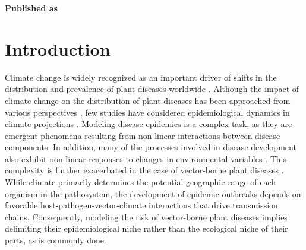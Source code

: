 \vspace{3cm}





\textbf{Published as}

\vspace{0.5cm}


\newpage
\section{Introduction}

Climate change is widely recognized as an important driver of shifts in the
distribution and prevalence of plant diseases worldwide
\cite{harvell2002climate, Delgado-Baquerizo2020,  Rocklov2020, Dudney2021,
    Chaloner2021, Singh2023}. Although the impact of climate change on the
distribution of plant diseases has been approached from various perspectives
\cite{bergot2004simulation,pangga2011pathogen}, few studies have considered
epidemiological dynamics in climate projections
\cite{bebber2019climate,Juroszek2015}. Modeling disease epidemics is a complex
task, as they are emergent phenomena resulting from non-linear interactions
between disease components. In addition, many of the processes involved in
disease development also exhibit non-linear responses to changes in
environmental variables \cite{scherm1994global,garrett2011complexity}. This
complexity is further exacerbated in the case of vector-borne plant diseases
\cite{jeger2019epidemiology}. While climate primarily determines the potential
geographic range of each organism in the pathosystem, the development of
epidemic outbreaks depends on favorable host-pathogen-vector-climate
interactions that drive transmission chains. Consequently, modeling the risk of
vector-borne plant diseases implies delimiting their epidemiological niche
rather than the ecological niche of their parts, as is commonly done.

